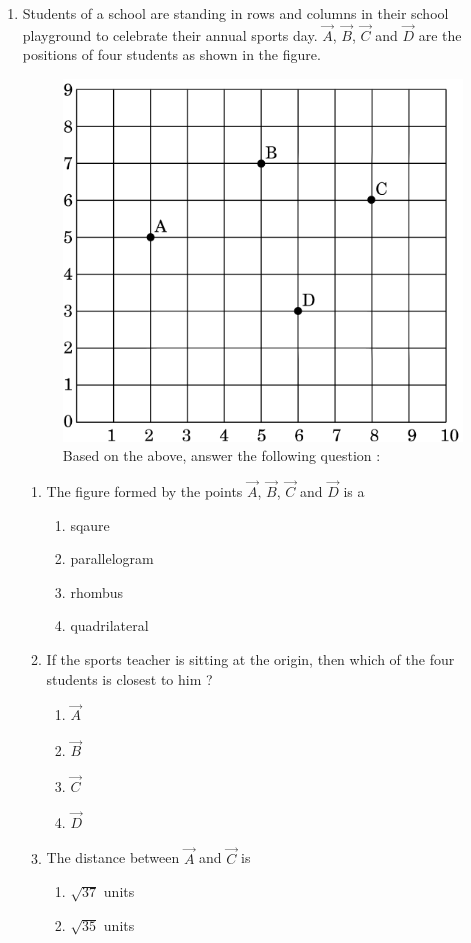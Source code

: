 \begin{enumerate}[label=\thesubsection.\arabic*.,ref=\thesubsection.\theenumi]
     \item Students of a school are standing in rows and columns in their school playground to celebrate their annual sports day. $\vec{A}$, $\vec{B}$, $\vec{C}$ and $\vec{D}$ are the positions of four students as shown in the figure. \\
	     	     \begin{figure}[ht]
		     \centering
		     \includegraphics[width=0.45\columnwidth,height=0.45\columnwidth]{figs/fwc3.png}
		     \caption{Based on the above, answer the following question :}
		     \label{fig:my_label}
	     \end{figure}
\begin{enumerate}[label=(\roman*)]
	\item The figure formed by the points $\vec{A}$, $\vec{B}$, $\vec{C}$ and $\vec{D}$ is a
		\begin{enumerate}[label=(\Alph*)]
			\item sqaure
			\item parallelogram
			\item rhombus
			\item quadrilateral
		\end{enumerate}
	\item If the sports teacher is sitting at the origin, then which of the four students is closest to him ?
		\begin{enumerate}[label=(\Alph*)]
			\item $\vec{A}$
			\item $\vec{B}$
			\item $\vec{C}$
			\item $\vec{D}$
		\end{enumerate}
	\item The distance between $\vec{A}$ and $\vec{C}$ is 
		\begin{enumerate}[label=(\Alph*)]
			\item $\sqrt{37}$ units
			\item $\sqrt{35}$ units

\end{enumerate}
\end{enumerate}
\end{enumerate}
